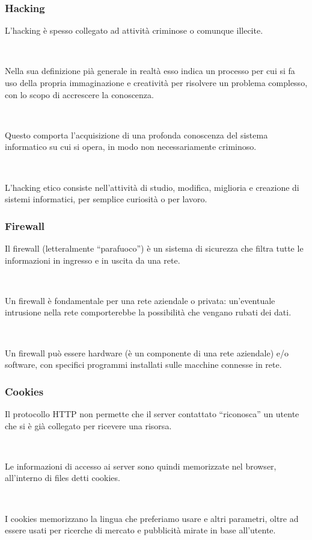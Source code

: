 \documentclass[]{beamer}
\begin{document}
\begin{frame}
\frametitle{Hacking}
L'hacking è spesso collegato ad attività criminose o comunque illecite. \pause

~

Nella sua definizione pià generale in realtà esso indica un processo per cui si fa uso della propria immaginazione e creatività per risolvere un problema complesso, con lo scopo di accrescere la conoscenza.\pause

~

Questo comporta l'acquisizione di una profonda conoscenza del sistema informatico su cui si opera, in modo non necessariamente criminoso.\pause

~

L'\alert{hacking etico} consiste nell'attività di studio, modifica, miglioria e creazione di sistemi informatici, per semplice curiosità o per lavoro.
\end{frame}


\begin{frame}
\frametitle{Firewall}
Il firewall (letteralmente ``parafuoco'') è un sistema di sicurezza che \alert<1>{filtra tutte le informazioni in ingresso e in uscita da una rete}.\pause

~

Un firewall è fondamentale per una rete aziendale o privata: un'eventuale intrusione nella rete comporterebbe la possibilità che vengano rubati dei dati.\pause

~

Un firewall può essere hardware (è un componente di una rete aziendale) e/o software, con specifici programmi installati sulle macchine connesse in rete.
\end{frame}




\begin{frame}
\frametitle{Cookies}
Il protocollo HTTP non permette che il server contattato ``riconosca'' un utente che si è già collegato per ricevere una risorsa.\pause

~

Le informazioni di accesso ai server sono quindi memorizzate nel browser, all'interno di files detti \alert<2>{cookies}.\pause

~

I cookies memorizzano la lingua che preferiamo usare e altri parametri, oltre ad essere usati per ricerche di mercato e pubblicità mirate in base all'utente.
\end{frame}
\end{document}
